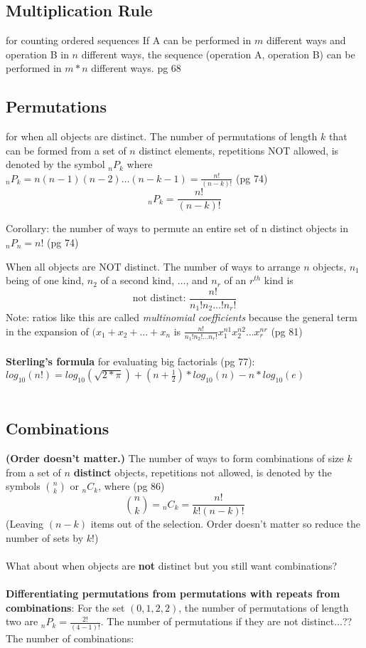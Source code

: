 \subsection{Multiplication Rule} for counting ordered sequences
If A can be performed in $m$ different ways and operation B in $n$ different ways, the sequence (operation A, operation B) can be performed in $m*n$ different ways. {\tiny pg 68}

\subsection{Permutations} for when all objects are distinct.
The number of permutations of length $k$ that can be formed from a set of $n$ distinct elements, repetitions NOT allowed, is denoted by the symbol ${_n}P_k$ where ${_n}P_k = n(n-1)(n-2) \dots (n - k - 1) = \frac{n!}{(n-k)!}$  {\tiny (pg 74) }\hfill \\
\[  {_n}P_k = \frac{n!}{(n-k)!} \]

Corollary: the number of ways to permute an entire set of n distinct objects in ${_n}P_n = n!$    {\tiny (pg 74) }\

When all objects are NOT distinct.  The number of ways to arrange $n$ objects, $n_1$ being of one kind, $n_2$ of a second kind, $\dots$, and $n_r$ of an $r^{th}$ kind is 
\[ \mbox{not distinct: } \frac{n!}{n{_1}!n{_2} \dots !n{_r!}} \]
Note: ratios like this are called \textit{multinomial coefficients} because the general term in the expansion of $(x_1 + x_2 + \dots + x_n$ is $\frac{n!}{n_1!n_2!\dots n_r!}x_1^{n1}x_2^{n2} \dots x_r^{nr}$  {\tiny (pg 81) }\hfill \\
\hfill \\
\textbf{Sterling's formula} for evaluating big factorials {\tiny (pg 77)}: $log_{10}(n!) = log_{10}(\sqrt{2*\pi}) + (n + \frac{1}{2})*log_{10}(n) - n*log_{10}(e)$ \hfill \\
\hfill \\

\subsection{Combinations}
\textbf{(Order doesn't matter.)} The number of ways to form combinations of size $k$ from a set of $n$ \textbf{distinct} objects, repetitions not allowed, is denoted by the symbols $\binom{n}{k}$ or ${_n}C_k$, where   {\tiny (pg 86)}
	\[ {n \choose k} = {_n}C_k = \frac{n!}{k!(n-k)!} \]
(Leaving $(n-k)$ items out of the selection.  Order doesn't matter so reduce the number of sets by $k!$) \hfill \\
\hfill \\
What about when objects are \textbf{not} distinct but you still want combinations? \hfill \\
\hfill \\
\textbf{Differentiating permutations from permutations with repeats from combinations}:
For the set $(0, 1, 2, 2)$, the number of permutations of length two are ${_n}P_k = \frac{2!}{(4-1)!}$.
The number of permutations if they are not distinct...??
The number of combinations: 
	

  

    
    
    
    
    
    
    
    
    
